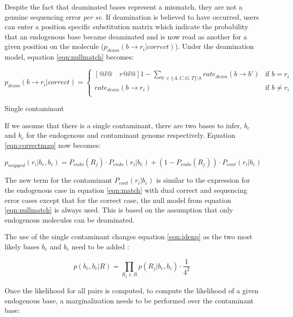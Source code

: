 \documentclass[a4paper,12pt]{article}
\begin{document}
\noindent Despite the fact that deaminated bases represent a mismatch, they are not a genuine sequencing error {\it per se}. If deamination is believed to have occurred, users can enter a position specific substitution matrix which indicate the probability that an endogenous base became deaminated and is now read as another for a given position on the molecule ($p_{deam}(b \to r_i | correct)$). Under the deamination model, equation \ref{eqn:nullmatch} becomes:

\begin{equation}
p_{deam}(b \to r_i | correct)   = \begin{cases}[@{}l@{\quad}r@{}l@{}]
    1 -  \sum\limits_{ b' \in \{A,C,G,T\}  \setminus b } rate_{deam}(b \to b') &  \text{if }  b = r_i    \\
    rate_{deam}(b \to r_i) &  \text{if }  b \ne r_i    \\
  \end{cases}
  \label{eqn:deammatch}
\end{equation} 

\noindent Single contaminant

If we assume that there is a single contaminant, there are two bases to infer, $b_e$ and $b_c$ for the endogenous and contaminant genome respectively. Equation \ref{eqn:correctmap} now becomes:

\begin{equation}
p_{mapped}(r_i|b_e,b_c) =  P_{endo}(R_j) \cdot P_{endo} (r_i|b_e)   + (1-P_{endo}(R_j)) \cdot P_{cont} (r_i|b_c)
\end{equation}

\noindent The new term for the contaminant $P_{cont} (r_i|b_c)$ is similar to the expression for the endogenous case in equation \ref{eqn:match} with dual correct and sequencing error cases except that for the correct case, the null model from equation \ref{eqn:nullmatch} is always used. This is based on the assumption that only endogenous molecules can be deaminated. 

The use of the single contaminant changes equation \ref{eqn:idenp} as the two most likely bases $b_e$ and $b_c$ need to be added :

\begin{equation}
  p(b_e,b_c|R)   = \prod_{R_j \in R} p(R_j|b_e,b_c) \cdot \frac {1} {4^2} 
\end{equation} 

\noindent Once the likelihood for all pairs is computed, to compute the likelihood of a given endogenous base, a marginalization needs to be performed over the contaminant base: 
\end{document}
